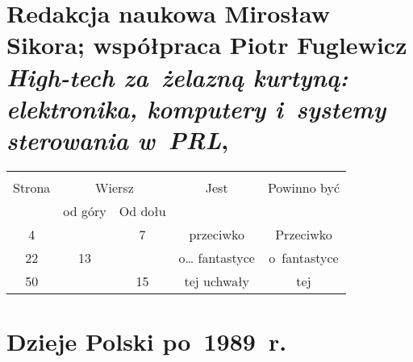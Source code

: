 \documentclass[a4paper,11pt]{article}
\numberwithin{equation}{section}
\begin{document}
\VerSpaceFour










\section{Redakcja naukowa Mirosław Sikora; współpraca Piotr
  Fuglewicz \textit{High-tech za~żelazną kurtyną: elektronika, komputery
  i~systemy sterowania w~PRL}, \cite{SikoraFuglewiczHighTech2017} }







\begin{center}

  \begin{tabular}{|c|c|c|c|c|}
    \hline
    & \multicolumn{2}{c|}{} & & \\
    Strona & \multicolumn{2}{c|}{Wiersz} & Jest
                              & Powinno być \\ \cline{2-3}
    & od góry & Od dołu & & \\
    \hline
    4   & &  7 & przeciwko & Przeciwko \\
    22  & 13 & & o\ldots{} fantastyce & o~fantastyce \\ %
    50  & & 15 & tej uchwały & tej \\
    \hline
  \end{tabular}

\end{center}

\VerSpaceTwo










\section{Dzieje Polski po~1989~r.}
\end{document}
